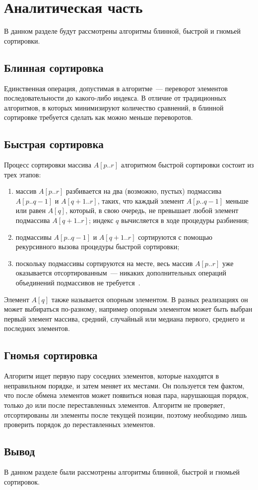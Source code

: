 \chapter{Аналитическая часть}

В данном разделе будут рассмотрены алгоритмы блинной, быстрой и гномьей сортировки.

\section{Блинная сортировка}

Единственная операция, допустимая в алгоритме~--- переворот элементов последовательности до какого-либо индекса.
В отличие от традиционных алгоритмов, в которых минимизируют количество сравнений, в блинной сортировке требуется сделать как можно меньше переворотов.

\section{Быстрая сортировка}

Процесс сортировки массива $A[p..r]$ алгоритмом быстрой сортировки состоит из трех этапов:
\begin{enumerate}
    \item массив $A[p..r]$ разбивается на два (возможно, пустых) подмассива $A[p..q-1]$ и $A[q+1..r]$, таких, что каждый элемент $A[p..q-1]$ меньше или равен $A[q]$, который, в свою очередь, не превышает любой элемент подмассива $A[q+1..r]$; индекс $q$ вычисляется в ходе процедуры разбиения;
    \item подмассивы $A[p..q-1]$ и $A[q+1..r]$ сортируются с помощью рекурсивного вызова процедуры быстрой сортировки;
    \item поскольку подмассивы сортируются на месте, весь массив $A[p..r]$ уже оказывается отсортированным~--- никаких дополнительных операций объединений подмассивов не требуется~\cite{qsort-book}.
\end{enumerate}

Элемент $A[q]$ также называется опорным элементом. 
В разных реализациях он может выбираться по-разному, например опорным элементом может быть выбран первый элемент массива, средний, случайный или медиана первого, среднего и последних элементов.

\section{Гномья сортировка}

Алгоритм ищет первую пару соседних элементов, которые находятся в неправильном порядке, и затем меняет их местами. 
Он пользуется тем фактом, что после обмена элементов может появиться новая пара, нарушающая порядок, только до или после переставленных элементов.
Алгоритм не проверяет, отсортированы ли элементы после текущей позиции, поэтому необходимо лишь проверить порядок до переставленных элементов.

\section*{Вывод}

В данном разделе были рассмотрены алгоритмы блинной, быстрой и гномьей сортировок.